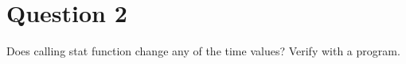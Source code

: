 \documentclass[main.tex]{subfiles}
\begin{document}
\section{Question 2}

Does calling stat function change any of the time values? Verify with a program.




\end{document}
